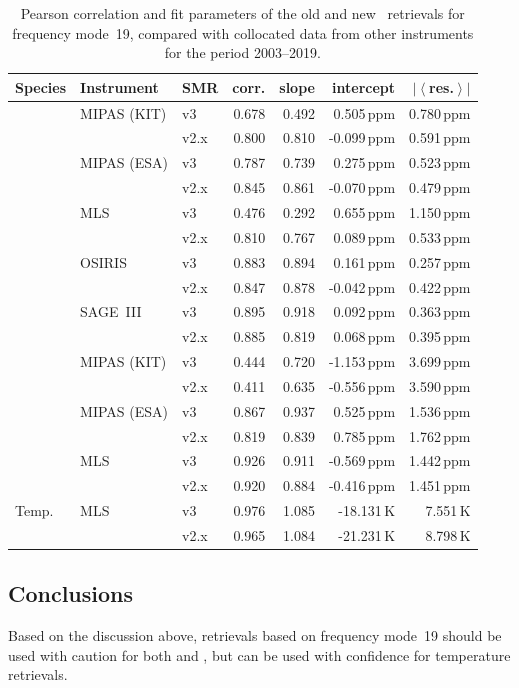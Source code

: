 \begin{table}[tbhp]
\centering
\caption{Pearson correlation and fit parameters of the old and new \smr\
retrievals for frequency mode~19, compared with collocated data from other
instruments for the period 2003--2019.
}
\label{tab:fm19:stats}
\begin{tabular}{lllrrrr}
    \toprule
    \textbf{Species} & \textbf{Instrument} & \textbf{SMR} & \textbf{corr.} & \textbf{slope} & \textbf{intercept} & \textbf{$\left|\left<\right.\right.$res.$\left.\left.\right>\right|$} \\
    \midrule
    \chem{O3}   & MIPAS (KIT)   & v3    & 0.678 & 0.492 &  0.505\,ppm   & 0.780\,ppm \\
                &               & v2.x  & 0.800 & 0.810 & -0.099\,ppm   & 0.591\,ppm \\
    \cline{2-7}
                & MIPAS (ESA)   & v3    & 0.787 & 0.739 &  0.275\,ppm   & 0.523\,ppm \\
                &               & v2.x  & 0.845 & 0.861 & -0.070\,ppm   & 0.479\,ppm \\
    \cline{2-7}
                & MLS           & v3    & 0.476 & 0.292 & 0.655\,ppm    & 1.150\,ppm \\
                &               & v2.x  & 0.810 & 0.767 & 0.089\,ppm    & 0.533\,ppm \\
    \cline{2-7}
                & OSIRIS        & v3    & 0.883 & 0.894 &  0.161\,ppm   & 0.257\,ppm \\
                &               & v2.x  & 0.847 & 0.878 & -0.042\,ppm   & 0.422\,ppm \\
    \cline{2-7}
                & SAGE~III      & v3    & 0.895 & 0.918 & 0.092\,ppm    & 0.363\,ppm \\
                &               & v2.x  & 0.885 & 0.819 & 0.068\,ppm    & 0.395\,ppm \\
    \midrule
    \chem{H_2O} & MIPAS (KIT)   & v3    & 0.444 & 0.720 & -1.153\,ppm   & 3.699\,ppm \\
                &               & v2.x  & 0.411 & 0.635 & -0.556\,ppm   & 3.590\,ppm \\
    \cline{2-7}
                & MIPAS (ESA)   & v3    & 0.867 & 0.937 & 0.525\,ppm    & 1.536\,ppm \\
                &               & v2.x  & 0.819 & 0.839 & 0.785\,ppm    & 1.762\,ppm \\
    \cline{2-7}
                & MLS           & v3    & 0.926 & 0.911 & -0.569\,ppm   & 1.442\,ppm \\
                &               & v2.x  & 0.920 & 0.884 & -0.416\,ppm   & 1.451\,ppm \\
    \midrule
    Temp.       & MLS           & v3    & 0.976 & 1.085 & -18.131\,K    & 7.551\,K \\
                &               & v2.x  & 0.965 & 1.084 & -21.231\,K    & 8.798\,K \\
    \bottomrule
\end{tabular}
\end{table}

\subsection{Conclusions}
\label{sec:fm19:conclusions}
Based on the discussion above, retrievals based on frequency mode~19 should be
used with caution for both \chem{O_3} and \chem{H_2O}, but can be used with
confidence for temperature retrievals.
